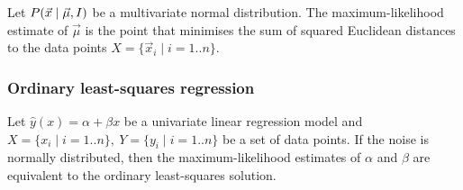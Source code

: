 \begin{thm}
  Let $P(\vec{x} \mid \vec{\mu}, I)$ be a multivariate normal
  distribution.
  The maximum-likelihood estimate of $\vec{\mu}$ is the point that minimises the
  sum of squared Euclidean distances to the data points $X = \{ \vec{x}_i \mid i
    = 1 .. n \}$.
\end{thm}

\subsubsection{Ordinary least-squares regression}

\begin{thm}
  Let $\hat{y}(x) = \alpha + \beta x$ be a univariate linear regression model and
  $X = \{ x_i \mid i = 1 .. n \},\ Y = \{ y_i \mid i = 1 .. n \}$ be a set of
  data points.
  If the noise is normally distributed, then the maximum-likelihood estimates of
  $\alpha$ and $\beta$ are equivalent to the ordinary least-squares solution.


\end{thm}
